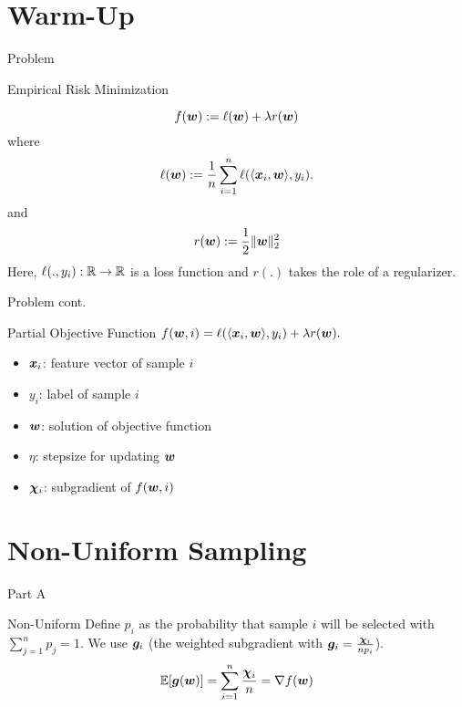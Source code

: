 \section{Warm-Up}
\begin{frame}{Problem}
\begin{block}{Empirical Risk Minimization}
\end{block}
\begin{equation}
    \label{eq:primalObjective}
    f(\bm{w}):= \ell(\bm{w})+\lambda r(\bm{w})
\end{equation}
where 
\begin{equation*}\label{eq:someEquationName}
    \ell(\bm{w}) := \frac1n \sum_{i=1}^n \ell(\langle \bm{x}_i, \bm{w} \rangle, y_i).
\end{equation*}
and 
\begin{equation*}
    r(\bm{w}) := \frac12 \|\bm{w}\|_2^2
\end{equation*}
Here, $\ell(.,y_i):\mathbb{R}\rightarrow\mathbb{R}$ is a loss function and $r(.)$ takes the role of a regularizer. 
\end{frame}

\begin{frame}{Problem cont.}
\begin{block}{Partial Objective Function}
$f(\bm{w}, i) = \ell(\langle \bm{x}_i, \bm{w}\rangle, y_i) + \lambda r(\bm{w}).$
\end{block}

\begin{itemize}
\item $\bm{x}_i$: feature vector of sample $i$
\item $y_i$: label of sample $i$
\item $\bm{w}$: solution of objective function
\item $\eta$: stepsize for updating $\bm{w}$
\item $\bm{\chi}_i$: subgradient of $f(\bm{w}, i)$
\end{itemize}
\end{frame}

\section{Non-Uniform Sampling}
\begin{frame}{Part A}
\Large \center{\color{blue}{ Non-Uniform Sampling Algorithms}}
\end{frame}

\begin{frame}{Non-Uniform}
Define $p_i$ as the probability that sample $i$ will be selected with $\sum_{j=1}^n p_j=1$. We use $\bm{g}_i$ (the weighted subgradient with $\bm{g}_i = \frac{\bm{\chi}_i}{n p_i}$).
\[
\mathbb{E}[\bm{g}(\bm{w})] = \sum_{i=1}^n \frac{\bm{\chi}_i}{n} = \nabla f(\bm{w})
\]
\end{frame}

